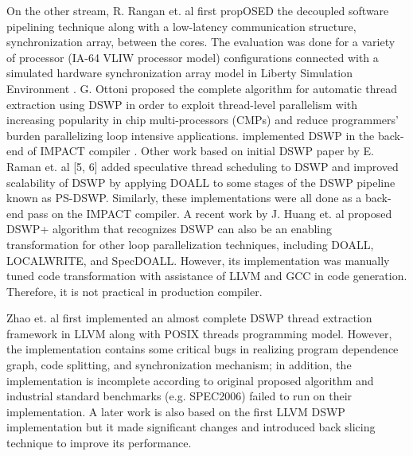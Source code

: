 \documentclass[letterpaper, 10 pt, conference]{ieeeconf}  %
\begin{document}
On the other stream, R. Rangan et. al first propOSED the decoupled software pipelining technique \cite{c12} along with a low-latency communication structure, synchronization array, between the cores. The evaluation was done for a variety of processor (IA-64 VLIW processor model) configurations connected with a simulated hardware synchronization array model in Liberty Simulation Environment \cite{c14}. G. Ottoni \cite{c3} proposed the complete algorithm for automatic thread extraction using DSWP in order to exploit thread-level parallelism with increasing popularity in chip multi-processors (CMPs) and reduce programmers' burden parallelizing loop intensive applications. \cite{c3} implemented DSWP in the back-end of IMPACT compiler \cite{c4}. Other work based on initial DSWP paper by E. Raman et. al [5, 6] added speculative thread scheduling to DSWP and improved scalability of DSWP by applying DOALL to some stages of the DSWP pipeline known as PS-DSWP. Similarly, these implementations were all done as a back-end pass on the IMPACT compiler. A recent work \cite{c15} by J. Huang et. al proposed DSWP+ algorithm that recognizes DSWP can also be an enabling transformation for other loop parallelization techniques, including DOALL, LOCALWRITE, and SpecDOALL. However, its implementation was manually tuned code transformation with assistance of LLVM and GCC in code generation. Therefore, it is not practical in production compiler. 

Zhao et. al \cite{c2} first implemented an almost complete DSWP thread extraction framework in LLVM along with POSIX threads programming model. However, the implementation contains some critical bugs in realizing program dependence graph, code splitting, and synchronization mechanism; in addition, the implementation is incomplete according to original proposed algorithm and industrial standard benchmarks (e.g. SPEC2006) failed to run on their implementation. A later work \cite{c7} is also based on the first LLVM DSWP implementation but it made significant changes and introduced back slicing technique to improve its performance.



\end{document}
